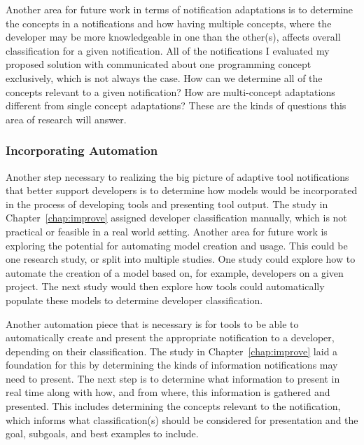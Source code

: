 Another area for future work in terms of notification adaptations is to determine the concepts in a notifications and how having multiple concepts, where the developer may be more knowledgeable in one than the other(s), affects overall classification for a given notification.
All of the notifications I evaluated my proposed solution with communicated about one programming concept exclusively, which is not always the case. How can we determine all of the concepts relevant to a given notification? How are multi-concept adaptations different from single concept adaptations? 
These are the kinds of questions this area of research will answer.

\subsubsection{Incorporating Automation}
Another step necessary to realizing the big picture of adaptive tool notifications that better support developers is to determine how models would be incorporated in the process of developing tools and presenting tool output. 
The study in Chapter~\ref{chap:improve} assigned developer classification manually, which is not practical or feasible in a real world setting. 
Another area for future work is exploring the potential for automating model creation and usage. This could be one research study, or split into multiple studies. One study could explore how to automate the creation of a model based on, for example, developers on a given project. The next study would then explore how tools could automatically populate these models to determine developer classification. 

Another automation piece that is necessary is for tools to be able to automatically create and present the appropriate notification to a developer, depending on their classification.
The study in Chapter~\ref{chap:improve} laid a foundation for this by determining the kinds of information notifications may need to present. The next step is to determine what information to present in real time along with how, and from where, this information is gathered and presented. 
This includes determining the concepts relevant to the notification, which informs what classification(s) should be considered for presentation and the goal, subgoals, and best examples to include.

